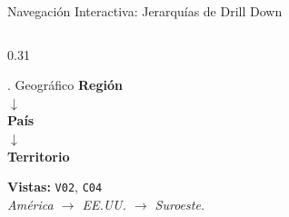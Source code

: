 \documentclass[aspectratio=169, 10pt]{beamer}
\begin{document}
\begin{frame}{Navegación Interactiva: Jerarquías de Drill Down}
\begin{columns}[t]
        \begin{column}{0.31\textwidth}
            \begin{block}{. Geográfico}
                \small
                \centering
                \textbf{Región}\\
                $\downarrow$\\[0.08cm]
                \textbf{País}\\
                $\downarrow$\\[0.08cm]
                \textbf{Territorio}\\[0.25cm]
                \raggedright
                \footnotesize
                \textbf{Vistas:} \texttt{V02}, \texttt{C04}\\
                \textit{América $\rightarrow$ EE.UU. $\rightarrow$ Suroeste.}
            \end{block}
        \end{column}
    \end{columns}
\end{frame}
\end{document}
